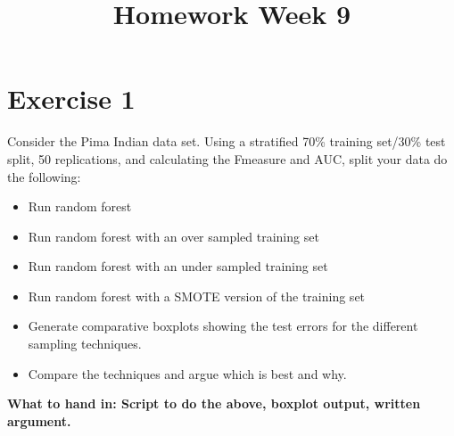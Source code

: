 \documentclass[a4paper]{article}
\begin{document}
\title{Homework Week 9}

\maketitle

\section{Exercise 1}

Consider the Pima Indian data set. Using a stratified 70\% training set/30\% test split, 50 replications, and calculating the Fmeasure and AUC, split your data do the following:

\begin{itemize}
\item Run random forest
\item Run random forest with an over sampled training set
\item Run random forest with an under sampled training set
\item Run random forest with a SMOTE version of the training set
\item Generate comparative boxplots showing the test errors for the different sampling techniques.
\item Compare the techniques and argue which is best and why.

\end{itemize}

\textbf{What to hand in: Script to do the above, boxplot output, written argument.}
\end{document}
